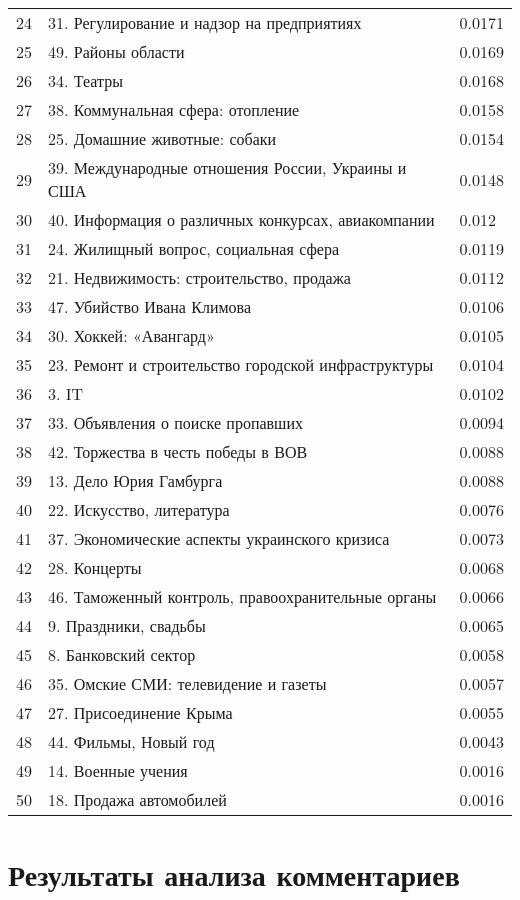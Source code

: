 \begin{longtable}[c]{| L{3cm} | C{7cm} | R{5cm} |}
24 & 31. Регулирование и надзор на предприятиях & 0.0171 \\
25 & 49. Районы области & 0.0169 \\
26 & 34. Театры & 0.0168 \\
27 & 38. Коммунальная сфера: отопление & 0.0158 \\
28 & 25. Домашние животные: собаки & 0.0154 \\
29 & 39. Международные отношения России, Украины и США & 0.0148 \\
30 & 40. Информация о различных конкурсах, авиакомпании & 0.012 \\
31 & 24. Жилищный вопрос, социальная сфера & 0.0119 \\
32 & 21. Недвижимость: строительство, продажа & 0.0112 \\
33 & 47. Убийство Ивана Климова & 0.0106 \\
34 & 30. Хоккей: «Авангард» & 0.0105 \\
35 & 23. Ремонт и строительство городской инфраструктуры & 0.0104 \\
36 & 3. IT & 0.0102 \\
37 & 33. Объявления о поиске пропавших & 0.0094 \\
38 & 42. Торжества в честь победы в ВОВ & 0.0088 \\
39 & 13. Дело Юрия Гамбурга & 0.0088 \\
40 & 22. Искусство, литература & 0.0076 \\
41 & 37. Экономические аспекты украинского кризиса & 0.0073 \\
42 & 28. Концерты & 0.0068 \\
43 & 46. Таможенный контроль, правоохранительные органы & 0.0066 \\
44 & 9. Праздники, свадьбы & 0.0065 \\
45 & 8. Банковский сектор & 0.0058 \\
46 & 35. Омские СМИ: телевидение и газеты & 0.0057 \\
47 & 27. Присоединение Крыма & 0.0055 \\
48 & 44. Фильмы, Новый год & 0.0043 \\
49 & 14. Военные учения & 0.0016 \\
50 & 18. Продажа автомобилей & 0.0016 \\
	\hline
\end{longtable}
\chapter{Результаты анализа комментариев} \label{app:comments}
